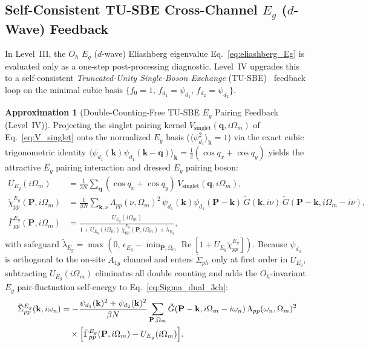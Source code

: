 \documentclass[11pt,a4paper]{article}
\numberwithin{equation}{section}
\theoremstyle{plain}
\theoremstyle{definition}
\newtheorem{approximation}{Approximation}[section]
\providecommand{\vk}{\mathbf{k}}
\providecommand{\vq}{\mathbf{q}}
\providecommand{\vP}{\mathbf{P}}
\providecommand{\re}{\operatorname{Re}}
\begin{document}
\subsection{Self-Consistent TU-SBE Cross-Channel $E_g$ ($d$-Wave) Feedback}
\label{sec:l4_tusbe}

In Level~III, the $O_h$ $E_g$ ($d$-wave) Eliashberg eigenvalue Eq.~\eqref{eq:eliashberg_Eg}
is evaluated only as a one-step post-processing diagnostic. Level~IV upgrades this to a
self-consistent \emph{Truncated-Unity Single-Boson Exchange} (TU-SBE)~\cite{Krien2019,Krien2021}
feedback loop on the minimal cubic basis $\{f_0 = 1,\, f_{d_1} = \psi_{d_1},\, f_{d_2} = \psi_{d_2}\}$.

\begin{approximation}[Double-Counting-Free TU-SBE $E_g$ Pairing Feedback (Level~IV)]
\label{approx:l4_tusbe}
Projecting the singlet pairing kernel $V_{\mathrm{singlet}}(\vq, i\Omega_m)$ of
Eq.~\eqref{eq:V_singlet} onto the normalized $E_g$ basis ($\langle \psi_{d_1}^2 \rangle_{\vk} = 1$)
via the exact cubic trigonometric identity
$\langle \psi_{d_1}(\vk)\psi_{d_1}(\vk-\vq)\rangle_{\vk} = \frac{1}{2}(\cos q_x + \cos q_y)$
yields the attractive $E_g$ pairing interaction and dressed $E_g$ pairing boson:
\begin{align}
    U_{E_g}(i\Omega_m)
    &= \frac{1}{2N}\sum_{\vq} (\cos q_x + \cos q_y)\, V_{\mathrm{singlet}}(\vq, i\Omega_m),
    \label{eq:l4_UEg} \\
    \tilde{\chi}_{pp}^{E_g}(\vP, i\Omega_m)
    &= \frac{1}{\beta N}\sum_{\vk,\nu}
       \Lambda_{pp}(\nu,\Omega_m)^2\, \psi_{d_1}(\vk)\psi_{d_1}(\vP - \vk)\,
       \tilde{G}(\vk, i\nu)\,\tilde{G}(\vP - \vk, i\Omega_m - i\nu),
    \label{eq:l4_chiEg} \\
    \bar{\Gamma}_{pp}^{E_g}(\vP, i\Omega_m)
    &= \frac{U_{E_g}(i\Omega_m)}{1 + U_{E_g}(i\Omega_m)\,\tilde{\chi}_{pp}^{E_g}(\vP, i\Omega_m) + \tilde{\lambda}_{E_g}},
    \label{eq:l4_GammaEg}
\end{align}
with safeguard $\tilde{\lambda}_{E_g} = \max(0,\, \epsilon_{E_g} - \min_{\vP,\Omega_m}\re[1 + U_{E_g}\tilde{\chi}_{pp}^{E_g}])$.
Because $\psi_{d_\alpha}$ is orthogonal to the on-site $A_{1g}$ channel and enters
$\tilde{\Sigma}_{ph}$ only at first order in $U_{E_g}$, subtracting $U_{E_g}(i\Omega_m)$
eliminates all double counting and adds the $O_h$-invariant $E_g$ pair-fluctuation
self-energy to Eq.~\eqref{eq:Sigma_dual_3ch}:
\begin{equation}
\begin{split}
    \tilde{\Sigma}_{pp}^{E_g}(\vk, i\omega_n)
    &= -\frac{\psi_{d_1}(\vk)^2 + \psi_{d_2}(\vk)^2}{\beta N}\sum_{\vP,\Omega_m}
       \tilde{G}(\vP - \vk, i\Omega_m - i\omega_n)\, \Lambda_{pp}(\omega_n,\Omega_m)^2 \\
    &\quad \times \Bigl[\bar{\Gamma}_{pp}^{E_g}(\vP, i\Omega_m) - U_{E_g}(i\Omega_m)\Bigr].
\end{split}
    \label{eq:l4_SigEg}
\end{equation}
\end{approximation}
\end{document}
